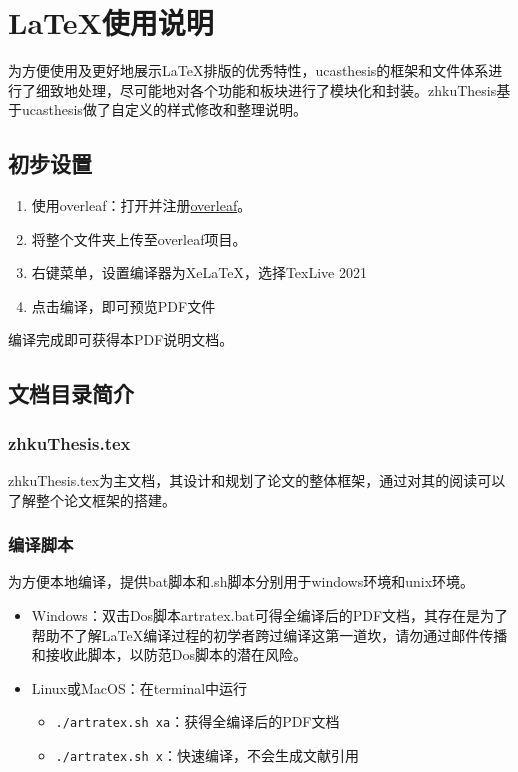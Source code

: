 \chapter{LaTeX使用说明}\label{chap:guide}

{
为方便使用及更好地展示LaTeX排版的优秀特性，ucasthesis的框架和文件体系进行了细致地处理，尽可能地对各个功能和板块进行了模块化和封装。zhkuThesis基于ucasthesis做了自定义的样式修改和整理说明。

\section{初步设置}

\begin{enumerate}
    \item 使用overleaf：打开并注册\href{https://cn.overleaf.com/}{overleaf}。
    \item 将整个文件夹上传至overleaf项目。
    \item 右键菜单，设置编译器为XeLaTeX，选择TexLive 2021
    \item 点击编译，即可预览PDF文件
\end{enumerate}

编译完成即可获得本PDF说明文档。

\section{文档目录简介}

\subsection{zhkuThesis.tex}

zhkuThesis.tex为主文档，其设计和规划了论文的整体框架，通过对其的阅读可以了解整个论文框架的搭建。

\subsection{编译脚本}

为方便本地编译，提供bat脚本和.sh脚本分别用于windows环境和unix环境。

\begin{itemize}
    \item Windows：双击Dos脚本artratex.bat可得全编译后的PDF文档，其存在是为了帮助不了解LaTeX编译过程的初学者跨过编译这第一道坎，请勿通过邮件传播和接收此脚本，以防范Dos脚本的潜在风险。
    \item Linux或MacOS：在terminal中运行
        \begin{itemize}
            \item \verb|./artratex.sh xa|：获得全编译后的PDF文档
            \item \verb|./artratex.sh x|：快速编译，不会生成文献引用
        \end{itemize}
\end{itemize}

}
